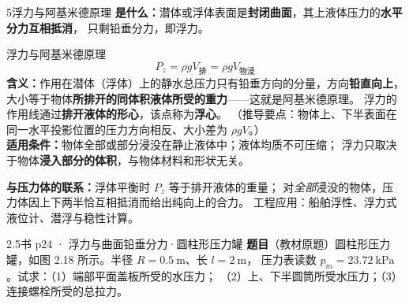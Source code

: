 \begin{kaodian}{5}{浮力与阿基米德原理}
\textbf{是什么：}潜体或浮体表面是\textbf{封闭曲面}，其上液体压力的\textbf{水平分力互相抵消}，
只剩铅垂分力，即浮力。

\begin{gongshi}{浮力与阿基米德原理}
\[ P_z=\rho g V_{\text{排}}=\rho g V_{\text{物浸}} \]
\textbf{含义：}作用在潜体（浮体）上的静水总压力只有铅垂方向的分量，方向\textbf{铅直向上}，
大小等于物体\textbf{所排开的同体积液体所受的重力}——这就是阿基米德原理。
浮力的作用线通过\textbf{排开液体的形心}，该点称为\textbf{浮心}。
（推导要点：物体上、下半表面在同一水平投影位置的压力方向相反、大小差为 $\rho gV$。）\\
\textbf{适用条件：}物体全部或部分浸没在静止液体中；液体均质不可压缩；
浮力只取决于物体\textbf{浸入部分的体积}，与物体材料和形状无关。
\end{gongshi}

\textbf{与压力体的联系：}浮体平衡时 $P_z$ 等于排开液体的重量；
对\emph{全部}浸没的物体，压力体因上下两半恰互相抵消而给出纯向上的合力。
工程应用：船舶浮性、浮力式液位计、潜浮与稳性计算。

\begin{liti}{2.5}{书 p24 · 浮力与曲面铅垂分力·圆柱形压力罐}
\textbf{题目}（教材原题）圆柱形压力罐，如图 2.18 所示。半径 $R=0.5\ \mathrm{m}$、长 $l=2\ \mathrm{m}$，
压力表读数 $p_m=23.72\ \mathrm{kPa}$。试求：（1）端部平面盖板所受的水压力；
（2）上、下半圆筒所受水压力；（3）连接螺栓所受的总拉力。


\end{liti}
\end{kaodian}
